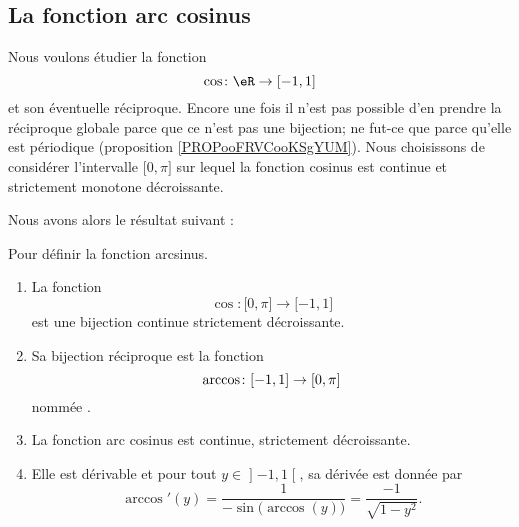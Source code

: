 \subsection{La fonction arc cosinus}

Nous voulons étudier la fonction
\begin{equation}
        \cos\colon \eR\to \mathopen[ -1 , 1 \mathclose] 
\end{equation}
et son éventuelle réciproque. Encore une fois il n'est pas possible d'en prendre la réciproque globale parce que ce n'est pas une bijection; ne fut-ce que parce qu'elle est périodique (proposition \ref{PROPooFRVCooKSgYUM}). Nous choisissons de considérer l'intervalle \( \mathopen[ 0 , \pi \mathclose]\) sur lequel la fonction cosinus est continue et strictement monotone décroissante.

Nous avons alors le résultat suivant :

\begin{propositionDef}     \label{PROPooZOZHooSMoYQD}
    Pour définir la fonction arcsinus.  
    
    \begin{enumerate}
        \item
    La fonction
    \begin{equation}
            \cos\colon \mathopen[ 0 , \pi \mathclose]\to \mathopen[ -1 , 1 \mathclose] 
    \end{equation}
    est une bijection continue strictement décroissante. 
    \item
    Sa bijection réciproque est la fonction 
    \begin{equation}
            \arccos\colon \mathopen[ -1 , 1 \mathclose]\to \mathopen[ 0 , \pi \mathclose] \\
    \end{equation}
    nommée .
    \item
        La fonction arc cosinus est continue, strictement décroissante.
    \item
        Elle est dérivable et pour tout \( y\in\mathopen] -1 , 1 \mathclose[\), sa dérivée est donnée par
    \begin{equation}
        \arccos'(y)=\frac{1}{ -\sin\big( \arccos(y) \big) }=\frac{ -1 }{ \sqrt{1-y^2} }.
    \end{equation}
    \end{enumerate}
\end{propositionDef}


